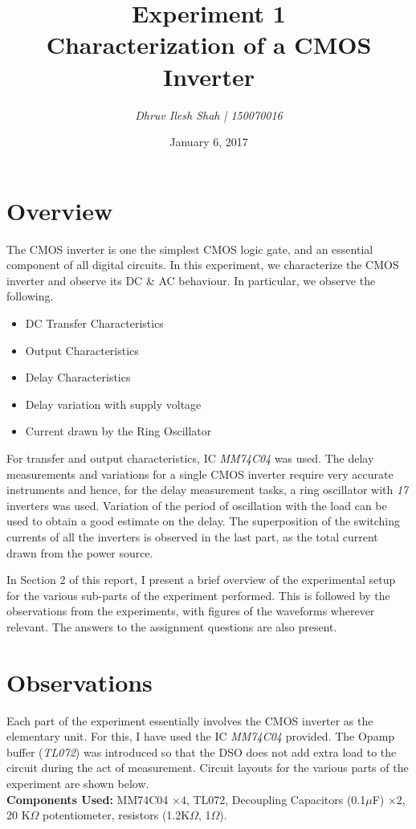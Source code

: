 \documentclass[a4paper, 11pt]{article}
\title{\bf Experiment 1\\ Characterization of a CMOS Inverter}
\author{\it Dhruv Ilesh Shah | 150070016}
\date{January 6, 2017}
\begin{document}
\maketitle
\section{Overview}
The CMOS inverter is one the simplest CMOS logic gate, and an essential component of all digital circuits. In this experiment, we characterize the CMOS inverter and observe its DC \& AC behaviour. In particular, we observe the following.
\begin{itemize}[label= $\rightarrow$]
	\item DC Transfer Characteristics
	\item Output Characteristics
	\item Delay Characteristics
	\item Delay variation with supply voltage
	\item Current drawn by the Ring Oscillator
\end{itemize}
For transfer and output characteristics, IC \emph{MM74C04} was used. The delay measurements and variations for a single CMOS inverter require very accurate instruments and hence, for the delay measurement tasks, a ring oscillator with {\it17} inverters was used. Variation of the period of oscillation with the load can be used to obtain a good estimate on the delay. The superposition of the switching currents of all the inverters is observed in the last part, as the total current drawn from the power source.
\par In Section 2 of this report, I present a brief overview of the experimental setup for the various sub-parts of the experiment performed. This is followed by the observations from the experiments, with figures of the waveforms wherever relevant. The answers to the assignment questions are also present.

\section{Observations}
Each part of the experiment essentially involves the CMOS inverter as the elementary unit. For this, I have used the IC \emph{MM74C04} provided. The Opamp buffer ({\em TL072}) was introduced so that the DSO does not add extra load to the circuit during the act of measurement. Circuit layouts for the various parts of the experiment are shown below.
\vspace{1em} \\
{\bf Components Used: }MM74C04 $\times 4$, TL072, Decoupling Capacitors (0.1$\mu$F) $\times 2$, 20 K$\Omega$ potentiometer, resistors (1.2K$\Omega$, 1$\Omega$).
\newpage
\end{document}
